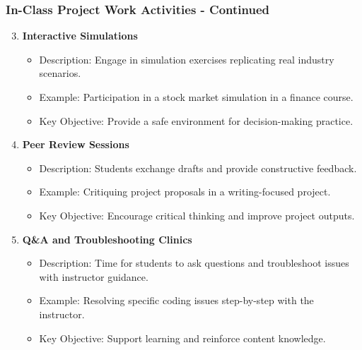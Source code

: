 \documentclass[aspectratio=169]{beamer}
\begin{document}
\begin{frame}[fragile]
  \frametitle{In-Class Project Work Activities - Continued}
  \begin{enumerate}
    \setcounter{enumi}{2} %
    \item \textbf{Interactive Simulations}
      \begin{itemize}
        \item Description: Engage in simulation exercises replicating real industry scenarios.
        \item Example: Participation in a stock market simulation in a finance course.
        \item Key Objective: Provide a safe environment for decision-making practice.
      \end{itemize}

    \item \textbf{Peer Review Sessions}
      \begin{itemize}
        \item Description: Students exchange drafts and provide constructive feedback.
        \item Example: Critiquing project proposals in a writing-focused project.
        \item Key Objective: Encourage critical thinking and improve project outputs.
      \end{itemize}

    \item \textbf{Q\&A and Troubleshooting Clinics}
      \begin{itemize}
        \item Description: Time for students to ask questions and troubleshoot issues with instructor guidance.
        \item Example: Resolving specific coding issues step-by-step with the instructor.
        \item Key Objective: Support learning and reinforce content knowledge.
      \end{itemize}
  \end{enumerate}
\end{frame}
\end{document}
